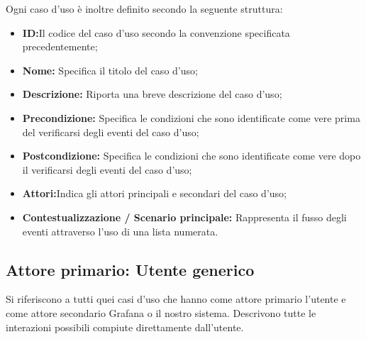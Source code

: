         \newpage
        Ogni caso d'uso è inoltre definito secondo la seguente struttura:
         \begin{itemize}
           \item \textbf{ID:}Il codice del caso d'uso secondo la convenzione specificata precedentemente;
           \item \textbf{Nome:} Specifica il titolo del caso d'uso;
           \item \textbf{Descrizione:} Riporta una breve descrizione del caso d'uso;
           \item \textbf{Precondizione:} Specifica le condizioni che sono identificate come vere
prima del verificarsi degli eventi del caso d'uso;
           \item \textbf{Postcondizione:} Specifica le condizioni che sono identificate come
vere dopo il verificarsi degli eventi del caso d'uso;
		   \item \textbf{Attori:}Indica gli attori principali e secondari del caso d'uso;
           \item \textbf{Contestualizzazione / Scenario principale:} Rappresenta il fusso degli eventi attraverso l'uso di una lista numerata.
         \end{itemize}

		\subsection{Attore primario: Utente generico}
		Si riferiscono a tutti quei casi d'uso che hanno come attore primario l'utente e come attore secondario Grafana o il nostro sistema. Descrivono tutte le interazioni possibili compiute direttamente dall'utente.
		
